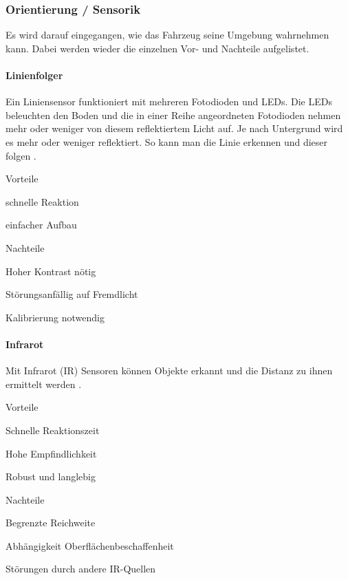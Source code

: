 \documentclass[../main.tex]{subfiles}
\begin{document}
\subsubsection{Orientierung / Sensorik}

Es wird darauf eingegangen, wie das Fahrzeug seine Umgebung wahrnehmen kann. Dabei werden wieder die einzelnen Vor- und Nachteile aufgelistet.

\paragraph{Linienfolger}
Ein Liniensensor funktioniert mit mehreren Fotodioden und LEDs. Die LEDs beleuchten den Boden und die in einer Reihe angeordneten Fotodioden nehmen mehr oder weniger von diesem reflektiertem Licht auf. Je nach Untergrund wird es mehr oder weniger reflektiert. So kann man die Linie erkennen und dieser folgen \cite{liniensensor}.
 

\begin{minipage}[t]{0.48\textwidth}
\begin{items}
  \item [Vorteile]
  \item schnelle Reaktion
  \item einfacher Aufbau
\end{items}
\end{minipage}
\hfill
\begin{minipage}[t]{0.48\textwidth}
\begin{items}
  \item [Nachteile]
  \item Hoher Kontrast nötig
  \item Störungsanfällig auf Fremdlicht
  \item Kalibrierung notwendig
\end{items}
\end{minipage}

\paragraph{Infrarot}
Mit Infrarot (IR) Sensoren können Objekte erkannt und die Distanz zu ihnen ermittelt werden \cite{ir_sensor}.


\begin{minipage}[t]{0.48\textwidth}
\begin{items}
  \item [Vorteile]
  \item Schnelle Reaktionszeit
  \item Hohe Empfindlichkeit
  \item Robust und langlebig
\end{items}
\end{minipage}
\hfill
\begin{minipage}[t]{0.48\textwidth}
\begin{items}
  \item [Nachteile]
  \item Begrenzte Reichweite
  \item Abhängigkeit Oberflächenbeschaffenheit
  \item Störungen durch andere IR-Quellen
\end{items}
\end{minipage}
\end{document}
